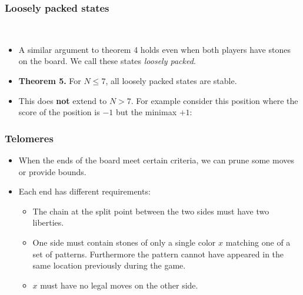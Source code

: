\documentclass{beamer}
\begin{document}
    \begin{frame}
        \frametitle{Loosely packed states}
        \begin{center}
            \cleargoban
            \showgoban[b2,h2]\\\medskip
            \cleargoban
            \showgoban[b2,g2]
        \end{center}
        \begin{itemize}
            \item A similar argument to theorem 4 holds even when both players have stones
                on the board. We call these states \textit{loosely packed}.
            \item \textbf{Theorem 5.} For $N\leq7$, all loosely packed states are stable.
            \pause
            \item This does \textbf{not} extend to $N>7$. For example consider this position
                where the score of the position is $-1$ but the minimax $+1$:
                \begin{center}
                    \cleargoban
                    \showgoban[b2,j2]
                \end{center}
        \end{itemize}
    \end{frame}

    \begin{frame}
        \frametitle{Telomeres}
        \begin{itemize}
            \item When the ends of the board meet certain criteria, we can prune some moves or provide bounds.
            \item Each end has different requirements:
                \begin{itemize}
                    \item The chain at the split point between the two sides must have two liberties.
                    \item One side must contain stones of only a single color $x$ matching one of a set of patterns. Furthermore the pattern cannot have appeared in the same location previously during the game.
                    \item $x$ must have no legal moves on the other side.
                \end{itemize}
        \end{itemize}
    \end{frame}
\end{document}
